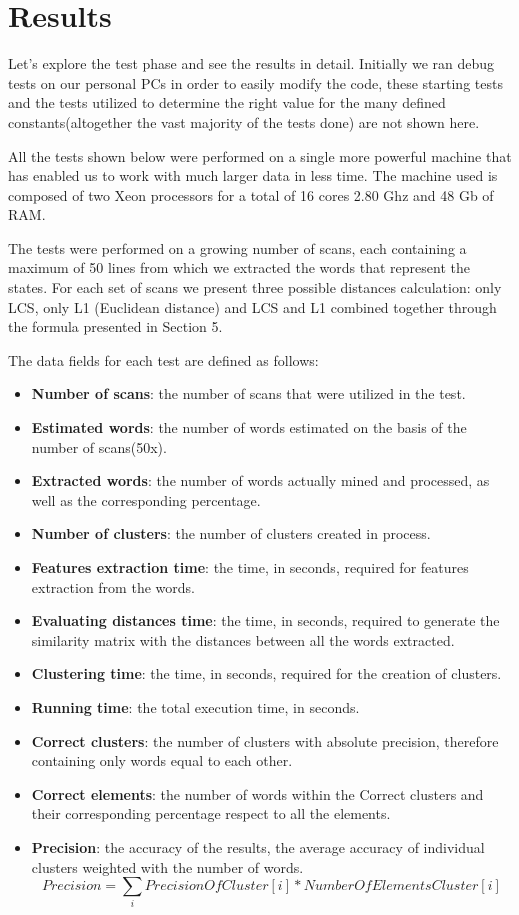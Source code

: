 \section{Results}

Let's explore the test phase and see the results in detail. Initially we ran debug tests on our personal PCs in order to easily modify the code, these starting tests and the tests utilized to determine the right value for the many defined constants(altogether the vast majority of the tests done) are not shown here. 

All the tests shown below were performed on a single more powerful machine that has enabled us to work with much larger data in less time. The machine used is composed of two Xeon processors for a total of 16 cores 2.80 Ghz and 48 Gb of RAM.

The tests were performed on a growing number of scans, each containing a maximum of 50 lines from which we extracted the words that represent the states. For each set of scans we present three possible distances calculation: only LCS, only L1 (Euclidean distance) and LCS and L1 combined together through the formula presented in Section 5.

\vspace{3mm}

The data fields for each test are defined as follows:
\begin{itemize}
\item \textbf{Number of scans}: the number of scans that were utilized in the test.
\item \textbf{Estimated words}: the number of words estimated on the basis of the number of scans(50x).
\item\textbf{Extracted words}: the number of words actually mined and processed, as well as the corresponding percentage.
\item \textbf{Number of clusters}: the number of clusters created in process.
\item \textbf{Features extraction time}: the time, in seconds, required for features extraction from the words.
\item \textbf{Evaluating distances time}: the time, in seconds, required to generate the similarity matrix with the distances between all the words extracted.
\item \textbf{Clustering time}: the time, in seconds, required for the creation of clusters.
\item \textbf{Running time}: the total execution time, in seconds.
\item \textbf{Correct clusters}: the number of clusters with absolute precision, therefore containing only words equal to each other.
\item \textbf{Correct elements}: the number of words within the Correct clusters and their corresponding percentage respect to all the elements.
\item \textbf{Precision}: the accuracy of the results, the average accuracy of individual clusters weighted with the number of words.
$$Precision = \sum_i PrecisionOfCluster[i]*NumberOfElementsCluster[i]$$
\end{itemize}

